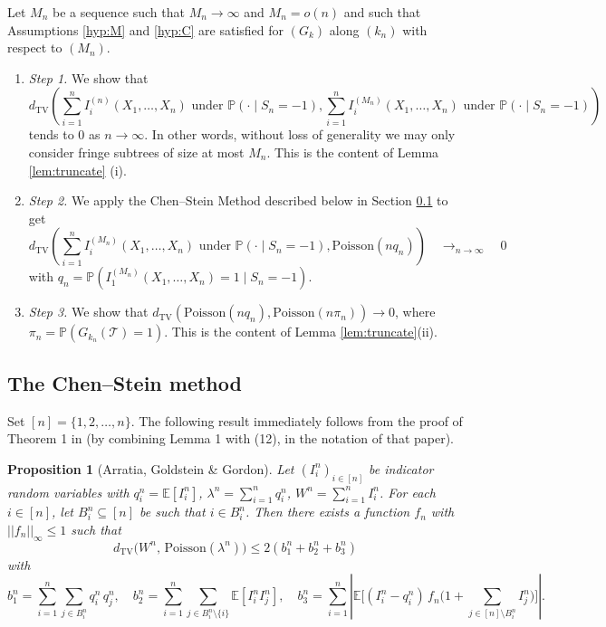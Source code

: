 \documentclass[a4paper,11pt]{article}
\newtheorem{proposition}[theorem]{Proposition}
\newcommand{\E}{\mathbb{E}}
\DeclareRobustCommand{\P}{\mathbb{P}}
\DeclareRobustCommand{\1}{\mathbf{1}}
\newcommand{\dTV}{d_{\mathrm{TV}}}
\newcommand{\Po}{\mathrm{Poisson}}
\begin{document}
Let $M_n$ be a sequence such that  $M_n\to\infty$ and $M_n=o(n)$ and such that 
 Assumptions \ref{hyp:M} and \ref{hyp:C} are satisfied  for $(G_k)$ along $(k_{n})$ with respect to $(M_{n})$.
\begin{enumerate}
\item[--] \emph{Step 1.}  We show that
$$\dTV \left( \sum_{i=1}^{n} I^{(n)}_{i}(X_{1}, \ldots,X_{n}) \textrm{ under } \P( \cdot \mid S_{n}=-1), \sum_{i=1}^{n} I^{(M_{n})}_{i}(X_{1}, \ldots,X_{n}) \textrm{ under } \P( \cdot \mid S_{n}=-1)\right)$$
tends to $0$ as $n \rightarrow\infty$.
 In other words, without loss of generality we may only consider fringe subtrees of size at most $M_{n}$. This is the content of Lemma \ref{lem:truncate} (i).
\item[--] \emph{Step 2.}  We apply the Chen--Stein Method described below in Section \ref{sec:chen_stein_framework} to get
$$
\dTV \left( \sum_{i=1}^{n} I^{(M_{n})}_{i}(X_{1}, \ldots,X_{n}) \textrm{ under } \P( \cdot \mid S_{n}=-1),  \Po(n q_{n})\right)  \quad \mathop{\longrightarrow}_{n \rightarrow \infty} \quad0
$$
with $q_n= \P(I^{(M_{n})}_{1}(X_{1}, \ldots,X_{n}) =1  \mid S_{n}=-1)$.
\item[--] \emph{Step 3.} We show that
$
\dTV(\Po(nq_n),\Po(n\pi_n))\to0$,
where 
$\pi_n=\P(G_{k_n}(\mathcal T)=1)$. This is the content of Lemma
\ref{lem:truncate}\textup{(ii)}.
\end{enumerate}





\subsection{The Chen--Stein method}
\label{sec:chen_stein_framework}
Set $[n]= \{1,2, \ldots,n\}$. The following result immediately follows from the proof of Theorem 1 in \cite{AGG89} (by combining Lemma 1 with (12), in the notation of that paper).
\begin{proposition}[Arratia, Goldstein \& Gordon]
\label{prop:AGG}
Let $(I^{n}_i)_{i \in [n]}$ be indicator random variables with
$q^{n}_i = \E[I^{n}_i]$, $\lambda^{n} = \sum_{i=1}^n q^n_i$,
$W^n = \sum_{i=1}^n I^n_i$.
For each $i \in [n]$, let $B^n_i \subseteq [n]$ be such that $i \in B^n_i$. Then there exists a function $f_n$ with $||f_n||_{\infty} \leq 1$  such that
\[
  \dTV\bigl(W^n,\, \Po(\lambda^{n})\bigr)
  \leq  2 (b^n_1 + b^n_2 + b^n_3)
\]
with $$ 
b^n_1= \textstyle\sum_{i=1}^n \sum_{j \in B^n_i} q^n_i\, q^n_j,  \quad  b^n_2 = \textstyle\sum_{i=1}^n \sum_{j \in B^n_i \setminus \{i\}} \E[I^n_i I^n_j], \quad 
  b^n_3 = \textstyle\sum_{i=1}^n \left| \E\bigl[(I^n_i - q^n_i)\, f_n\big( 1 +\sum_{j\in [n]\setminus B^n_i} I^n_j\big)\bigr] \right|.
  $$
\end{proposition}
\end{document}
